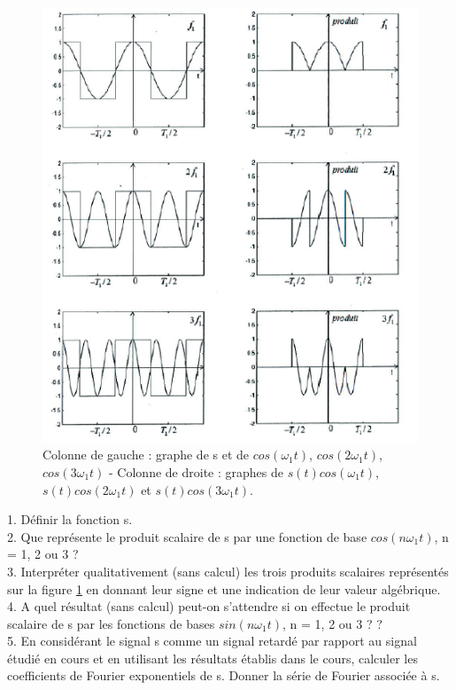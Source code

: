 	\begin{figure}[h!]
		\centering
		\includegraphics[scale=0.8]{images/Exo_Fourier_Lea.png}
		\caption{Colonne de gauche : graphe de s et de $cos(\omega_{1}t)$, $cos(2\omega_{1}t)$, $cos(3\omega_{1}t)$ - Colonne de droite
			: graphes de $s(t)cos(\omega_{1}t)$, $s(t)cos(2\omega_{1}t)$ et $s(t)cos(3\omega_{1}t)$.}	
		\label{Fig:Exo_Fourier_signal_carré} 
	\end{figure}

	1. Définir la fonction s.\\
	2. Que représente le produit scalaire de s par une fonction de base $cos(n\omega_{1}t)$, n = 1, 2 ou 3 ?\\
	3. Interpréter qualitativement (sans calcul) les trois produits scalaires représentés sur la figure \ref{Fig:Exo_Fourier_signal_carré} en donnant leur signe et une indication de leur valeur algébrique.\\
	4. A quel résultat (sans calcul) peut-on s'attendre si on effectue le produit scalaire de s par les fonctions de bases $sin(n\omega_{1}t)$, n = 1, 2 ou 3 ? ?\\
	5. En considérant le signal s comme un signal retardé par rapport au signal étudié en
	cours et en utilisant les résultats établis dans le cours, calculer les coefficients de Fourier exponentiels de s. Donner la série de Fourier associée à s.\\
	
